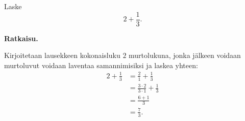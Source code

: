     \begin{esimerkki}
        Laske
        \[
            2 + \frac{1}{3}.
        \]
        
        \textbf{Ratkaisu.}
        
		Kirjoitetaan lausekkeen kokonaisluku $2$ murtolukuna, jonka
		jälkeen voidaan murtoluvut voidaan laventaa samannimisiksi
		ja laskea yhteen:
        \begin{align*}
           2 + \frac{1}{3} &= \frac{2}{1} + \frac{1}{3}  \\ 
	       				   &= \frac{3 \cdot 2}{3 \cdot 1} + \frac{1}{3} \\ 
	       				   &= \frac{6+1}{3} \\ 
	       				   &= \frac{7}{3}.
        \end{align*}
    \end{esimerkki}
    

    

